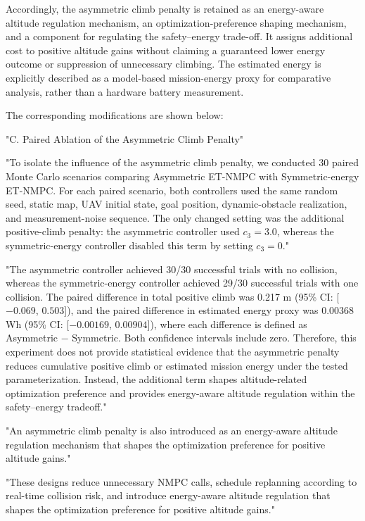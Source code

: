 \documentclass[12pt, twosides]{article}
\theoremstyle{definition}
\begin{document}
Accordingly, the asymmetric climb penalty is retained as an energy-aware altitude regulation mechanism, an optimization-preference shaping mechanism, and a component for regulating the safety--energy trade-off. It assigns additional cost to positive altitude gains without claiming a guaranteed lower energy outcome or suppression of unnecessary climbing. The estimated energy is explicitly described as a model-based mission-energy proxy for comparative analysis, rather than a hardware battery measurement.

The corresponding modifications are shown below:

"C. Paired Ablation of the Asymmetric Climb Penalty"

"To isolate the influence of the asymmetric climb penalty, we conducted 30 paired Monte Carlo scenarios comparing Asymmetric ET-NMPC with Symmetric-energy ET-NMPC. For each paired scenario, both controllers used the same random seed, static map, UAV initial state, goal position, dynamic-obstacle realization, and measurement-noise sequence. The only changed setting was the additional positive-climb penalty: the asymmetric controller used $c_3=3.0$, whereas the symmetric-energy controller disabled this term by setting $c_3=0$."

"The asymmetric controller achieved 30/30 successful trials with no collision, whereas the symmetric-energy controller achieved 29/30 successful trials with one collision. The paired difference in total positive climb was 0.217 m (95\% CI: [$-0.069$, $0.503$]), and the paired difference in estimated energy proxy was 0.00368 Wh (95\% CI: [$-0.00169$, $0.00904$]), where each difference is defined as Asymmetric $-$ Symmetric. Both confidence intervals include zero. Therefore, this experiment does not provide statistical evidence that the asymmetric penalty reduces cumulative positive climb or estimated mission energy under the tested parameterization. Instead, the additional term shapes altitude-related optimization preference and provides energy-aware altitude regulation within the safety--energy tradeoff."

"An asymmetric climb penalty is also introduced as an energy-aware altitude regulation mechanism that shapes the optimization preference for positive altitude gains."

"These designs reduce unnecessary NMPC calls, schedule replanning according to real-time collision risk, and introduce energy-aware altitude regulation that shapes the optimization preference for positive altitude gains."
\end{document}
